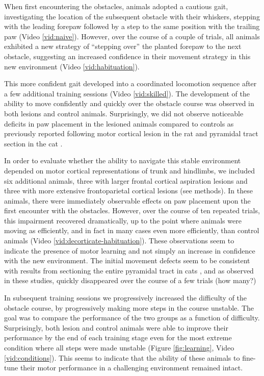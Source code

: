 When first encountering the obstacles, animals adopted a cautious gait, investigating the location of the subsequent obstacle with their whiskers, stepping with the leading forepaw followed by a step to the same position with the trailing paw (Video \ref{vid:naive}). However, over the course of a couple of trials, all animals exhibited a new strategy of ``stepping over'' the planted forepaw to the next obstacle, suggesting an increased confidence in their movement strategy in this new environment (Video \ref{vid:habituation}).

This more confident gait developed into a coordinated locomotion sequence after a few additional training sessions (Video \ref{vid:skilled}). The development of the ability to move confidently and quickly over the obstacle course was observed in both lesions and control animals. Surprisingly, we did not observe noticeable deficits in paw placement in the lesioned animals compared to controls as previously reported following motor cortical lesion in the rat \cite{Metz2002} and pyramidal tract section in the cat \cite{Liddell1944}.

In order to evaluate whether the ability to navigate this stable environment depended on motor cortical representations of trunk and hindlimbs, we included six additional animals, three with larger frontal cortical aspiration lesions and three with more extensive frontoparietal cortical lesions (see methods). In these animals, there were immediately observable effects on paw placement upon the first encounter with the obstacles. However, over the course of ten repeated trials, this impairment recovered dramatically, up to the point where animals were moving as efficiently, and in fact in many cases even more efficiently, than control animals (Video \ref{vid:decorticate-habituation}). These observations seem to indicate the presence of motor learning and not simply an increase in confidence with the new environment. The initial movement defects seem to be consistent with results from sectioning the entire pyramidal tract in cats \cite{Liddell1944}, and as observed in these studies, quickly disappeared over the course of a few trials (how many?)

In subsequent training sessions we progressively increased the difficulty of the obstacle course, by progressively making more steps in the course unstable. The goal was to compare the performance of the two groups as a function of difficulty. Surprisingly, both lesion and control animals were able to improve their performance by the end of each training stage even for the most extreme condition where all steps were made unstable (Figure \ref{fig:learning}, Video \ref{vid:conditions}). This seems to indicate that the ability of these animals to fine-tune their motor performance in a challenging environment remained intact.

